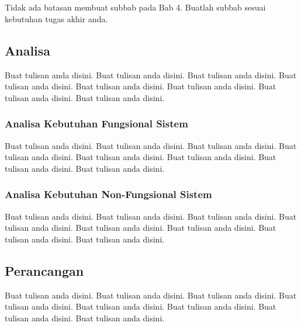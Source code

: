 %
%
%
%


\chapter{\babEmpat}
Tidak ada batasan membuat subbab pada Bab 4. Buatlah subbab sesuai kebutuhan tugas akhir anda.
\section{Analisa}
Buat tulisan anda disini. Buat tulisan anda disini. Buat tulisan anda disini. Buat tulisan anda disini. Buat tulisan anda disini. Buat tulisan anda disini. Buat tulisan anda disini. Buat tulisan anda disini.

\subsection{Analisa Kebutuhan Fungsional Sistem}
Buat tulisan anda disini. Buat tulisan anda disini. Buat tulisan anda disini. Buat tulisan anda disini. Buat tulisan anda disini. Buat tulisan anda disini. Buat tulisan anda disini. Buat tulisan anda disini.

\subsection{Analisa Kebutuhan Non-Fungsional Sistem}
Buat tulisan anda disini. Buat tulisan anda disini. Buat tulisan anda disini. Buat tulisan anda disini. Buat tulisan anda disini. Buat tulisan anda disini. Buat tulisan anda disini. Buat tulisan anda disini.

\section{Perancangan}
Buat tulisan anda disini. Buat tulisan anda disini. Buat tulisan anda disini. Buat tulisan anda disini. Buat tulisan anda disini. Buat tulisan anda disini. Buat tulisan anda disini. Buat tulisan anda disini.

